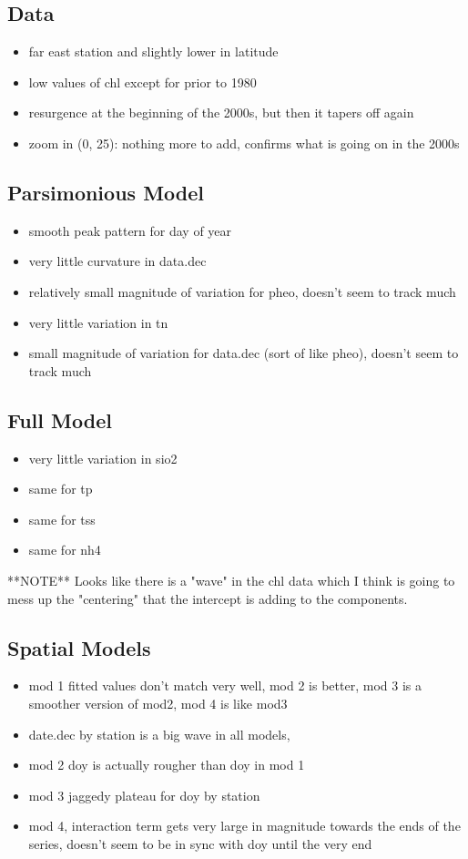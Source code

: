 \documentclass[12pt]{amsart}
\begin{document}
\subsection{Data}
\begin{itemize}
\item far east station and slightly lower in latitude
\item low values of chl except for prior to 1980
\item resurgence at the beginning of the 2000s, but then it tapers off again
\item zoom in (0, 25): nothing more to add, confirms what is going on in the 2000s
\end{itemize}
\subsection{Parsimonious Model}
\begin{itemize}
\item smooth peak pattern for day of year
\item very little curvature in data.dec
\item relatively small magnitude of variation for pheo, doesn't seem to track much
\item very little variation in tn
\item small magnitude of variation for data.dec (sort of like pheo), doesn't seem to track much
\end{itemize}
\subsection{Full Model}
\begin{itemize}
\item very little variation in sio2
\item same for tp
\item same for tss
\item same for nh4
\end{itemize}
**NOTE** Looks like there is a "wave" in the chl data which I think is going to mess up the "centering" that the intercept is adding to the components.

\subsection{Spatial Models}

\begin{itemize}
\item mod 1 fitted values don't match very well, mod 2 is better, mod 3 is a smoother version of mod2, mod 4 is like mod3
\item date.dec by station is a big wave in all models, 
\item mod 2 doy is actually rougher than doy in mod 1
\item mod 3 jaggedy plateau for doy by station
\item mod 4, interaction term gets very large in magnitude towards the ends of the series, doesn't seem to be in sync with doy until the very end

\end{itemize}
\end{document}
